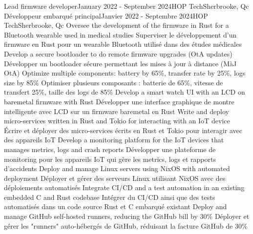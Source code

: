       \resumeSubheadingEnFr
        {Lead firmware developer}{January 2022 - September 2024}{HOP Tech}{Sherbrooke, Qc}
        {Développeur embarqué principal}{Janvier 2022 - Septembre 2024}{HOP Tech}{Sherbrooke, Qc}
            \resumeItemListStart
                \resumeItemEnFr
                    {Oversee the development of the firmware in Rust for a Bluetooth wearable used in medical studies}
                    {Superviser le développement d'un firmware en Rust pour un wearable Bluetooth utilisé dans des études médicales}
                \resumeItemEnFr
                    {Develop a secure bootloader to do remote firmware upgrades (OtA updates)}
                    {Développer un bootloader sécure permettant les mises à jour à distance (MàJ OtA)}
                \resumeItemEnFr
                    {Optimize multiple components: battery by 65\%, transfer rate by 25\%, logs size by 85\%}
                    {Optimiser plusieurs composants : batterie de 65\%, vitesse de transfert 25\%, taille des logs de 85\%}
                \resumeItemEnFr
                    {Develop a smart watch UI with an LCD on baremetal firmware with Rust}
                    {Développer une interface graphique de montre intelligente avec LCD sur un firmware baremetal en Rust}
                \resumeItemEnFr
                    {Write and deploy micro-services written in Rust and Tokio for interacting with an IoT device}
                    {Écrire et déployer des micro-services écrits en Rust et Tokio pour interagir avec des appareils IoT}
                \resumeItemEnFr
                    {Develop a monitoring platform for the IoT devices that manages metrics, logs and crash reports}
                    {Développer une plateforme de monitoring pour les appareils IoT qui gère les metrics, logs et rapports d'accidents}
                \resumeItemEnFr
                    {Deploy and manage Linux servers using NixOS with automated deployment}
                    {Déployer et gérer des serveurs Linux utilisant NixOS avec des déploiements automatisés}
                \resumeItemEnFr
                    {Integrate CI/CD and a test automation in an existing embedded C and Rust codebase}
                    {Intégrer du CI/CD ainsi que des tests automatisés dans un code source Rust et C embarqué existant}
                \resumeItemEnFr
                    {Deploy and manage GitHub self-hosted runners, reducing the GitHub bill by 30\%}
                    {Déployer et gérer les "runners" auto-hébergés de GitHub, réduisant la facture GitHub de 30\%}

